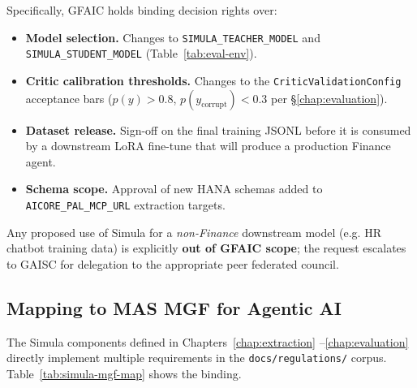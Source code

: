 \documentclass[11pt,a4paper]{article}
\begin{document}
Specifically, GFAIC holds binding decision rights over:

\begin{itemize}[nosep]
  \item \textbf{Model selection.} Changes to \texttt{SIMULA\_TEACHER\_MODEL}
        and \texttt{SIMULA\_STUDENT\_MODEL} (Table~\ref{tab:eval-env}).
  \item \textbf{Critic calibration thresholds.} Changes to the
        \texttt{CriticValidationConfig} acceptance bars
        ($p(y) > 0.8$, $p(y_{\text{corrupt}}) < 0.3$ per \S\ref{chap:evaluation}).
  \item \textbf{Dataset release.} Sign-off on the final training
        JSONL before it is consumed by a downstream LoRA fine-tune
        that will produce a production Finance agent.
  \item \textbf{Schema scope.} Approval of new HANA schemas added to
        \texttt{AICORE\_PAL\_MCP\_URL} extraction targets.
\end{itemize}

Any proposed use of Simula for a \emph{non-Finance} downstream model
(e.g. HR chatbot training data) is explicitly \textbf{out of GFAIC
scope}; the request escalates to GAISC for delegation to the
appropriate peer federated council.

\subsection{Mapping to MAS MGF for Agentic AI}

The Simula components defined in Chapters~\ref{chap:extraction}%
--\ref{chap:evaluation} directly implement multiple requirements in
the \texttt{docs/regulations/} corpus. Table~\ref{tab:simula-mgf-map}
shows the binding.
\end{document}
